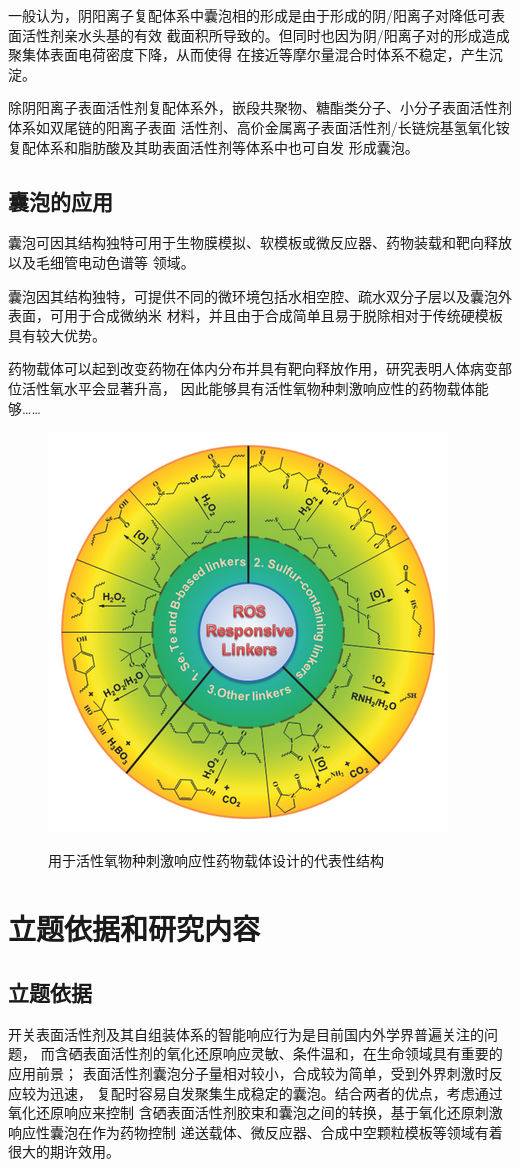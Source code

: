 \documentclass[bachelor,winfonts,replaceperiod]{jnuthesis}
\begin{document}
    一般认为，阴阳离子复配体系中囊泡相的形成是由于形成的阴/阳离子对降低可表面活性剂亲水头基的有效
    截面积所导致的\cite{刘洪国2016}。但同时也因为阴/阳离子对的形成造成聚集体表面电荷密度下降，从而使得
    在接近等摩尔量混合时体系不稳定，产生沉淀。
    
    除阴阳离子表面活性剂复配体系外，嵌段共聚物、糖酯类分子、小分子表面活性剂体系如双尾链的阳离子表面
    活性剂、高价金属离子表面活性剂/长链烷基氢氧化铵复配体系和脂肪酸及其助表面活性剂等体系中也可自发
    形成囊泡\cite{刘洪国2016}。
        
    \subsection{囊泡的应用}
    囊泡可因其结构独特可用于生物膜模拟、软模板或微反应器、药物装载和靶向释放以及毛细管电动色谱等
    领域\cite{蒋玲玲2018}。
    
    囊泡因其结构独特，可提供不同的微环境包括水相空腔、疏水双分子层以及囊泡外表面，可用于合成微纳米
    材料，并且由于合成简单且易于脱除相对于传统硬模板具有较大优势。
    
    药物载体可以起到改变药物在体内分布并具有靶向释放作用，研究表明人体病变部位活性氧水平会显著升高，
    因此能够具有活性氧物种刺激响应性的药物载体能够……    
    \begin{figure}[htbp]
        \centering
        \includegraphics[width= .426\textwidth]{figure/vesicle-ros.png}\\
        \caption{用于活性氧物种刺激响应性药物载体设计的代表性结构\cite{saravanakumar2017}}
        \label{fig:vesicle-ros}
    \end{figure}
    
    \section{立题依据和研究内容}
    \subsection{立题依据}
    开关表面活性剂及其自组装体系的智能响应行为是目前国内外学界普遍关注的问题，
    而含硒表面活性剂的氧化还原响应灵敏、条件温和，在生命领域具有重要的应用前景；
    表面活性剂囊泡分子量相对较小，合成较为简单，受到外界刺激时反应较为迅速，
    复配时容易自发聚集生成稳定的囊泡。结合两者的优点，考虑通过氧化还原响应来控制
    含硒表面活性剂胶束和囊泡之间的转换，基于氧化还原刺激响应性囊泡在作为药物控制
    递送载体、微反应器、合成中空颗粒模板等领域有着很大的期许效用。
    
\end{document}
